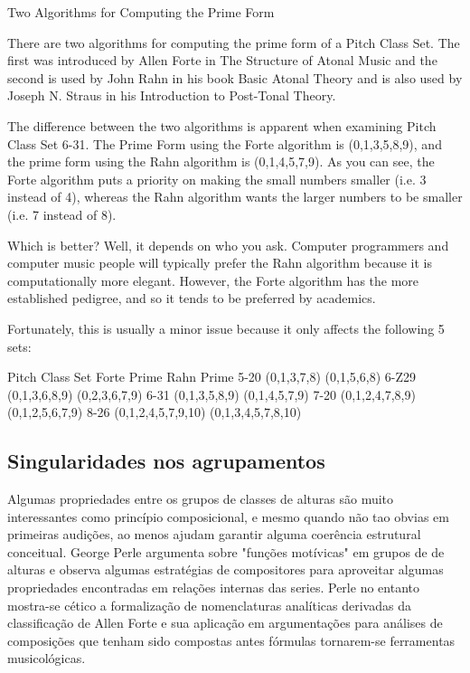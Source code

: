 \documentclass[
	12pt,				%
	openright,			%
	twoside,			%
	a4paper,			%
	english,			%
	french,				%
	spanish,			%
	brazil				%
	]{abntex2}
\begin{document}
\begin{citacao}
Two Algorithms for Computing the Prime Form

There are two algorithms for computing the prime form of a Pitch Class Set. The first was introduced by Allen Forte in The Structure of Atonal Music and the second is used by John Rahn in his book Basic Atonal Theory and is also used by Joseph N. Straus in his Introduction to Post-Tonal Theory.

The difference between the two algorithms is apparent when examining Pitch Class Set 6-31. The Prime Form using the Forte algorithm is (0,1,3,5,8,9), and the prime form using the Rahn algorithm is (0,1,4,5,7,9). As you can see, the Forte algorithm puts a priority on making the small numbers smaller (i.e. 3 instead of 4), whereas the Rahn algorithm wants the larger numbers to be smaller (i.e. 7 instead of 8).

Which is better? Well, it depends on who you ask. Computer programmers and computer music people will typically prefer the Rahn algorithm because it is computationally more elegant. However, the Forte algorithm has the more established pedigree, and so it tends to be preferred by academics.

Fortunately, this is usually a minor issue because it only affects the following 5 sets:

Pitch Class Set	Forte Prime	Rahn Prime
5-20	(0,1,3,7,8)	(0,1,5,6,8)
6-Z29	(0,1,3,6,8,9)	(0,2,3,6,7,9)
6-31	(0,1,3,5,8,9)	(0,1,4,5,7,9)
7-20	(0,1,2,4,7,8,9)	(0,1,2,5,6,7,9)
8-26	(0,1,2,4,5,7,9,10)	(0,1,3,4,5,7,8,10)
\end{citacao}


\subsection{Singularidades nos agrupamentos }

Algumas propriedades entre os grupos de classes de alturas são muito interessantes como princípio composicional, e mesmo quando não tao obvias em primeiras audições, ao menos ajudam garantir alguma coerência estrutural conceitual. George Perle argumenta sobre "funções motívicas" em grupos de de alturas\cite[ p.60-85]{perle1991serial} e observa algumas estratégias de compositores para aproveitar algumas propriedades encontradas em relações internas das series. Perle no entanto mostra-se cético a formalização de nomenclaturas analíticas derivadas da classificação de Allen Forte e sua aplicação em argumentações para análises de composições que tenham sido compostas antes fórmulas tornarem-se ferramentas musicológicas.\cite{perle1990pitch}
\end{document}
